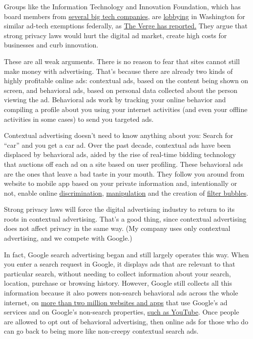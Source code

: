Groups like the Information Technology and Innovation Foundation, which
has board members from \href{https://itif.org/people/board}{several big
tech companies}, are
\href{https://itif.org/publications/2019/01/14/grand-bargain-data-privacy-legislation-america}{lobbying}
in Washington for similar ad-tech exemptions federally, as
\href{https://www.theverge.com/2019/1/14/18182051/data-privacy-congress-grand-bargain-proposal-democrats-amazon-google-facebook-ccpa-coppa-hipaa}{The
Verge has reported.} They argue that strong privacy laws would hurt the
digital ad market, create high costs for businesses and curb innovation.

These are all weak arguments. There is no reason to fear that sites
cannot still make money with advertising. That's because there are
already two kinds of highly profitable online ads: contextual ads, based
on the content being shown on screen, and behavioral ads, based on
personal data collected about the person viewing the ad. Behavioral ads
work by tracking your online behavior and compiling a profile about you
using your internet activities (and even your offline activities in some
cases) to send you targeted ads.

Contextual advertising doesn't need to know anything about you: Search
for ``car'' and you get a car ad. Over the past decade, contextual ads
have been displaced by behavioral ads, aided by the rise of real-time
bidding technology that auctions off each ad on a site based on user
profiling. These behavioral ads are the ones that leave a bad taste in
your mouth. They follow you around from website to mobile app based on
your private information and, intentionally or not, enable online
\href{http://fortune.com/2019/03/28/facebook-hud-discrimination/}{discrimination},
\href{https://www.cbsnews.com/news/facebook-for-the-first-time-acknowledges-election-manipulation/}{manipulation}
and the creation of
\href{https://www.theguardian.com/technology/2017/may/22/social-media-election-facebook-filter-bubbles}{filter
bubbles}.

Strong privacy laws will force the digital advertising industry to
return to its roots in contextual advertising. That's a good thing,
since contextual advertising does not affect privacy in the same way.
(My company uses only contextual advertising, and we compete with
Google.)

In fact, Google search advertising began and still largely operates this
way. When you enter a search request in Google, it displays ads that are
relevant to that particular search, without needing to collect
information about your search, location, purchase or browsing history.
However, Google still collects all this information because it also
powers non-search behavioral ads across the whole internet, on
\href{https://support.google.com/ads/answer/2662856?hl=en-GB}{more than
two million websites and apps} that use Google's ad services and on
Google's non-search properties,
\href{https://support.google.com/youtube/answer/2454017?hl=en}{such as
YouTube}. Once people are allowed to opt out of behavioral advertising,
then online ads for those who do can go back to being more like
non-creepy contextual search ads.


